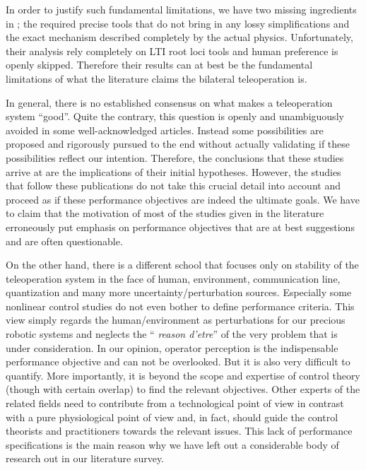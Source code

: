 In order to justify such fundamental limitations, we have two missing ingredients in \cite{danielmcaree}; the required precise tools that
do not bring in any lossy simplifications and the exact mechanism described completely by the actual physics. Unfortunately, their analysis 
rely completely on LTI root loci tools and human preference is openly skipped. Therefore their results can at best be the fundamental 
limitations of what the literature claims the bilateral teleoperation is.

In general, there is no established consensus on what makes a teleoperation system \enquote{good}. Quite the contrary, 
this question is openly and unambiguously avoided in some well-acknowledged articles. Instead some possibilities are 
proposed and rigorously pursued to the end without actually validating if these possibilities reflect our intention. 
Therefore, the conclusions that these studies arrive at are the implications of their initial hypotheses. However, 
the studies that follow these publications do not take this crucial detail into account and proceed as if these 
performance objectives are indeed the ultimate goals. We have to claim that the motivation of most of the studies 
given in the literature erroneously put emphasis on performance objectives that are at best suggestions and are often 
questionable. 

On the other hand, there is a different school that focuses only on stability of the teleoperation system in the 
face of human, environment, communication line, quantization and many more uncertainty/perturbation sources. 
Especially some nonlinear control studies do not even bother to define performance criteria. This view simply 
regards the human/environment as perturbations for our precious robotic systems and neglects the \enquote{\emph{%
reason d'etre}} of the very problem that is under consideration. In our opinion, operator perception is the 
indispensable performance objective and can not be overlooked. But it is also very difficult to quantify. More 
importantly, it is beyond the scope and expertise of control theory (though with certain overlap) to find the relevant 
objectives. Other experts of the related fields need to contribute from a technological point of view in 
contrast with a pure physiological point of view and, in fact,  should guide the control theorists and practitioners 
towards the relevant issues. This lack of performance specifications is the main reason why we have left out a considerable 
body of research out in our literature survey.

